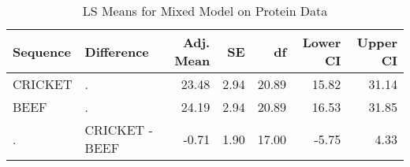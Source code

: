 \begin{table}

\caption{\label{tab:proteinDataLSMeans}LS Means for Mixed Model on Protein Data}
\centering
\begin{tabular}[t]{l>{}l|rrrrr}
\toprule
Sequence & Difference & Adj. Mean & SE & df & Lower CI & Upper CI\\
\midrule
CRICKET & . & 23.48 & 2.94 & 20.89 & 15.82 & 31.14\\
BEEF & . & 24.19 & 2.94 & 20.89 & 16.53 & 31.85\\
. & CRICKET - BEEF & -0.71 & 1.90 & 17.00 & -5.75 & 4.33\\
\bottomrule
\end{tabular}
\end{table}
